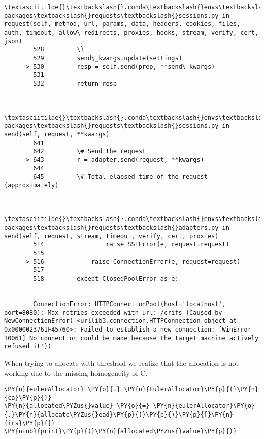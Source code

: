 \begin{Verbatim}[commandchars=\\\{\}]
        \textasciitilde{}\textbackslash{}.conda\textbackslash{}envs\textbackslash{}SACCRconda\textbackslash{}lib\textbackslash{}site-packages\textbackslash{}requests\textbackslash{}sessions.py in request(self, method, url, params, data, headers, cookies, files, auth, timeout, allow\_redirects, proxies, hooks, stream, verify, cert, json)
        528         \}
        529         send\_kwargs.update(settings)
    --> 530         resp = self.send(prep, **send\_kwargs)
        531 
        532         return resp
    

        \textasciitilde{}\textbackslash{}.conda\textbackslash{}envs\textbackslash{}SACCRconda\textbackslash{}lib\textbackslash{}site-packages\textbackslash{}requests\textbackslash{}sessions.py in send(self, request, **kwargs)
        641 
        642         \# Send the request
    --> 643         r = adapter.send(request, **kwargs)
        644 
        645         \# Total elapsed time of the request (approximately)
    

        \textasciitilde{}\textbackslash{}.conda\textbackslash{}envs\textbackslash{}SACCRconda\textbackslash{}lib\textbackslash{}site-packages\textbackslash{}requests\textbackslash{}adapters.py in send(self, request, stream, timeout, verify, cert, proxies)
        514                 raise SSLError(e, request=request)
        515 
    --> 516             raise ConnectionError(e, request=request)
        517 
        518         except ClosedPoolError as e:
    

        ConnectionError: HTTPConnectionPool(host='localhost', port=8080): Max retries exceeded with url: /crifs (Caused by NewConnectionError('<urllib3.connection.HTTPConnection object at 0x0000023761F45760>: Failed to establish a new connection: [WinError 10061] No connection could be made because the target machine actively refused it'))

    \end{Verbatim}

    When trying to allocate with threshold we realize that the allocation is
not working due to the missing homogeneity of C.

    \begin{tcolorbox}[breakable, size=fbox, boxrule=1pt, pad at break*=1mm,colback=cellbackground, colframe=cellborder]
\begin{Verbatim}[commandchars=\\\{\}]
\PY{n}{eulerAllocator} \PY{o}{=} \PY{n}{EulerAllocator}\PY{p}{(}\PY{n}{ca}\PY{p}{)}
\PY{n}{allocated\PYZus{}value} \PY{o}{=} \PY{n}{eulerAllocator}\PY{o}{.}\PY{n}{allocate\PYZus{}ead}\PY{p}{(}\PY{p}{)}\PY{p}{[}\PY{n}{irs}\PY{p}{]}
\PY{n+nb}{print}\PY{p}{(}\PY{n}{allocated\PYZus{}value}\PY{p}{)}
\end{Verbatim}
\end{tcolorbox}

